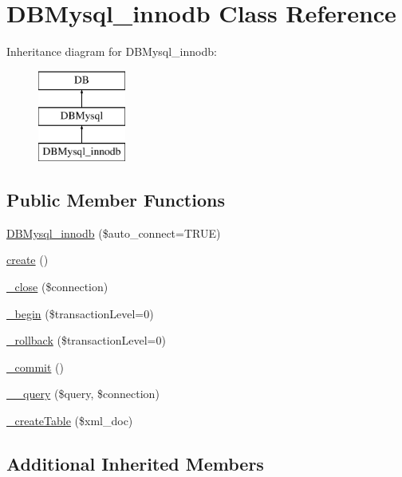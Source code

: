 \hypertarget{classDBMysql__innodb}{\section{D\-B\-Mysql\-\_\-innodb Class Reference}
\label{classDBMysql__innodb}
}
Inheritance diagram for D\-B\-Mysql\-\_\-innodb\-:\begin{figure}[H]
\begin{center}
\leavevmode
\includegraphics[height=3.000000cm]{classDBMysql__innodb}
\end{center}
\end{figure}
\subsection*{Public Member Functions}
\begin{DoxyCompactItemize}
\item 
\hyperlink{classDBMysql__innodb_a427178f2ed07dbec683c2de9d0be925d}{D\-B\-Mysql\-\_\-innodb} (\$auto\-\_\-connect=T\-R\-U\-E)
\item 
\hyperlink{classDBMysql__innodb_ac00d0e52855fb50fc453dd78367de102}{create} ()
\item 
\hyperlink{classDBMysql__innodb_a006f982aef8b7fd2909d3912e0afb032}{\-\_\-close} (\$connection)
\item 
\hyperlink{classDBMysql__innodb_a12c61046869744bc9df72753d6ca8348}{\-\_\-begin} (\$transaction\-Level=0)
\item 
\hyperlink{classDBMysql__innodb_a36779df768253f967560eee5a8c1ae89}{\-\_\-rollback} (\$transaction\-Level=0)
\item 
\hyperlink{classDBMysql__innodb_a9ffbd5a0d262ae7dd7fb840822a7e543}{\-\_\-commit} ()
\item 
\hyperlink{classDBMysql__innodb_a12af9ec87d5f630d282c2bc2571ee5fe}{\-\_\-\-\_\-query} (\$query, \$connection)
\item 
\hyperlink{classDBMysql__innodb_aa2b634992fbfaaadea5c897b8810b87c}{\-\_\-create\-Table} (\$xml\-\_\-doc)
\end{DoxyCompactItemize}
\subsection*{Additional Inherited Members}


